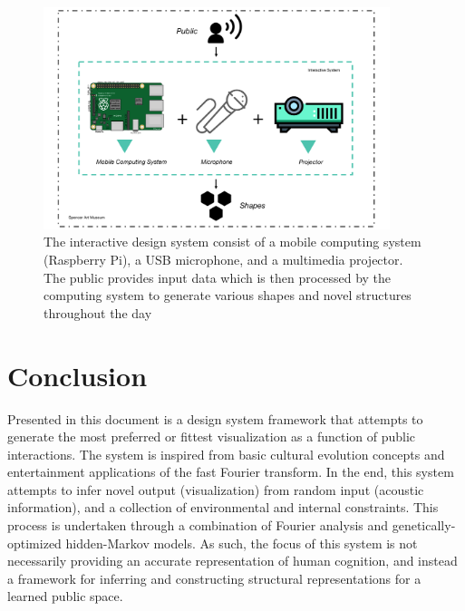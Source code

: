 \documentclass{evolang12}
\begin{document}

\begin{figure}[H]
 \centering
 \includegraphics[width=0.90\textwidth]{EvoLang12-SPENCERDESIGN.png}
 \caption{The interactive design system consist of a mobile computing system (Raspberry Pi), a USB microphone, and a multimedia projector. The public provides input data which is then processed by the computing system to generate various shapes and novel structures throughout the day}
 \label{EvoLang12-SPENCERDESIGN.png}
\end{figure}

\section{Conclusion}
Presented in this document is a design system framework that attempts to generate the most preferred or fittest visualization as a function of public interactions. The system is inspired from basic cultural evolution concepts and entertainment applications of the fast Fourier transform. In the end, this system attempts to infer novel output 
(visualization) from random input (acoustic information), and a collection of environmental and internal constraints. This process is undertaken through a combination of Fourier analysis and genetically-optimized hidden-Markov models. As such, the focus of this system is  not necessarily providing an accurate representation of human cognition, and instead a framework for inferring and constructing structural representations for a learned public space.
\end{document}
